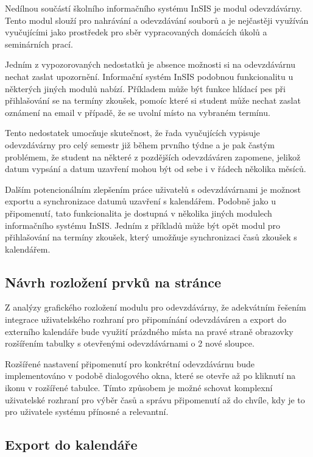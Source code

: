 Nedílnou součástí školního informačního systému InSIS je modul odevzdávárny. Tento modul slouží pro nahrávání a odevzdávání souborů a je nejčastěji využíván vyučujícími jako prostředek pro sběr vypracovaných domácích úkolů a seminárních prací. 

Jedním z vypozorovaných nedostatků je absence možnosti si na odevzdávárnu nechat zaslat upozornění. Informační systém InSIS podobnou funkcionalitu u některých jiných modulů nabízí. Příkladem může být funkce hlídací pes při přihlašování se na termíny zkoušek, pomoíc které si student může nechat zaslat oznámení na email v případě, že se uvolní místo na vybraném termínu.

Tento nedostatek umocňuje skutečnost, že řada vyučujících vypisuje odevzdávárny pro celý semestr již během prvního týdne a je pak častým problémem, že student na některé z pozdějších odevzdáváren zapomene, jelikož datum vypsání a datum uzavření mohou být od sebe i v řádech několika měsíců.

Dalším potencionálním zlepšením práce uživatelů s odevzdávárnami je možnost exportu a synchronizace datumů uzavření s kalendářem. Podobně jako u připomenutí, tato funkcionalita je dostupná v několika jiných modulech informačního systému InSIS. Jedním z příkladů může být opět modul pro přihlašování na termíny zkoušek, který umožňuje synchronizaci časů zkoušek s kalendářem.

\subsection{Návrh rozložení prvků na stránce}

Z analýzy grafického rozložení modulu pro odevzdávárny, že adekvátním řešením integrace uživatelského rozhraní pro připomínání odevzdáváren a export do externího kalendáře bude využití prázdného místa na pravé straně obrazovky rozšířením tabulky s otevřenými odevzdávárnami o 2 nové sloupce.

Rozšířené nastavení připomenutí pro konkrétní odevzdávárnu bude implementováno v podobě dialogového okna, které se otevře až po kliknutí na ikonu v rozšířené tabulce. Tímto způsobem je možné schovat komplexní uživatelské rozhraní pro výběr časů a správu připomenutí až do chvíle, kdy je to pro uživatele systému přínosné a relevantní. 

\subsection{Export do kalendáře}

